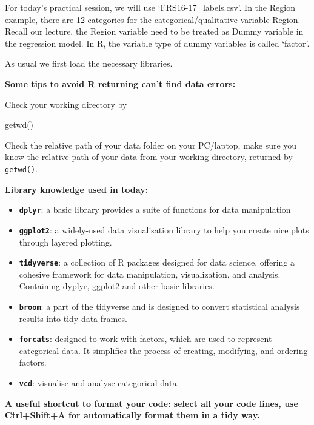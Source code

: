 \documentclass[
  letterpaper,
  DIV=11,
  numbers=noendperiod]{scrreprt}
\newenvironment{Shaded}{\begin{snugshade}}{\end{snugshade}}
\newcommand{\FunctionTok}[1]{\textcolor[rgb]{0.28,0.35,0.67}{#1}}
\newcommand{\NormalTok}[1]{\textcolor[rgb]{0.00,0.23,0.31}{#1}}
\begin{document}
For today's practical session, we will use `FRS16-17\_labels.csv'. In
the Region example, there are 12 categories for the
categorical/qualitative variable Region. Recall our lecture, the Region
variable need to be treated as Dummy variable in the regression model.
In R, the variable type of dummy variables is called `factor'.

As usual we first load the necessary libraries.

\textbf{Some tips to avoid R returning can't find data errors:}

Check your working directory by

\begin{Shaded}
\begin{Highlighting}[]
\FunctionTok{getwd}\NormalTok{()}
\end{Highlighting}
\end{Shaded}

Check the relative path of your data folder on your PC/laptop, make sure
you know the relative path of your data from your working directory,
returned by \texttt{getwd()}.

\textbf{Library knowledge used in today:}

\begin{itemize}
\item
  \textbf{\texttt{dplyr}}: a basic library provides a suite of functions
  for data manipulation
\item
  \textbf{\texttt{ggplot2}}: a widely-used data visualisation library to
  help you create nice plots through layered plotting.
\item
  \textbf{\texttt{tidyverse}}: a collection of R packages designed for
  data science, offering a cohesive framework for data manipulation,
  visualization, and analysis. Containing dyplyr, ggplot2 and other
  basic libraries.
\item
  \textbf{\texttt{broom}}: a part of the tidyverse and is designed to
  convert statistical analysis results into tidy data frames.
\item
  \textbf{\texttt{forcats}}: designed to work with factors, which are
  used to represent categorical data. It simplifies the process of
  creating, modifying, and ordering factors.
\item
  \textbf{\texttt{vcd}}: visualise and analyse categorical data.
\end{itemize}

\textbf{A useful shortcut to format your code: select all your code
lines, use Ctrl+Shift+A for automatically format them in a tidy way.}
\end{document}
